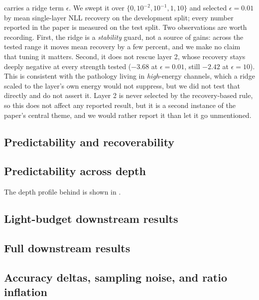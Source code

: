  carries a ridge term $\epsilon$. We swept it over
$\{0, 10^{-2}, 10^{-1}, 1, 10\}$ and selected $\epsilon = 0.01$ by mean
single-layer NLL recovery on the development split; every number reported in the
paper is measured on the test split. Two observations are worth recording. First,
the ridge is a \emph{stability} guard, not a source of gains: across the tested
range it moves mean recovery by a few percent, and we make no claim that tuning it
matters. Second, it does not rescue layer 2, whose recovery stays deeply negative
at every strength tested ($-3.68$ at $\epsilon=0.01$, still $-2.42$ at
$\epsilon=10$). This is consistent with the pathology living in \emph{high}-energy
channels, which a ridge scaled to the layer's own energy would not suppress, but we did
not test that directly and do not assert it. Layer 2 is never selected
by the recovery-based rule, so this does not affect any reported result, but it
is a second instance of the paper's central theme, and we would rather report it
than let it go unmentioned.

\subsection{Predictability and recoverability}


\subsection{Predictability across depth}


The depth profile behind  is shown in .

\subsection{Light-budget downstream results}


\subsection{Full downstream results}
\label{sec:app-downstream}



\subsection{Accuracy deltas, sampling noise, and ratio inflation}
\label{sec:app-noise}

